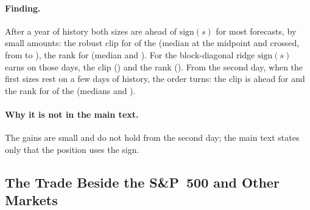 %
\paragraph{Finding.} After a year of history both sizes are ahead of
$\mathrm{sign}(s)$ for most forecasts, by small amounts: the robust clip for
\runappSzClipAbove{} of the \runappSzForecasts{} (median \runappSzClipMed{} at
the midpoint and \runappSzClipMedX{} crossed, from \runappSzClipLo{} to
\runappSzClipHi{}), the rank for \runappSzRankAbove{} (median
\runappSzRankMed{} and \runappSzRankMedX{}). For the block-diagonal ridge
$\mathrm{sign}(s)$ earns \runappSzSignMid{} on those \runappSzDays{} days, the
clip \runappSzClipRidge{} (\runappSzClipRidgeD{}) and the rank
\runappSzRankRidge{} (\runappSzRankRidgeD{}). From the second day, when the
first sizes rest on a few days of history, the order turns: the clip is ahead
for \runappSzClipAboveTwo{} and the rank for \runappSzRankAboveTwo{} of the
\runappSzForecasts{} (medians \runappSzClipMedTwo{} and \runappSzRankMedTwo{}).

\paragraph{Why it is not in the main text.} The gains are small and do not
hold from the second day; the main text states only that the position uses the
sign.

\subsection{The Trade Beside the S\&P~500 and Other Markets}
\label{sec:app_run_portfolio}

